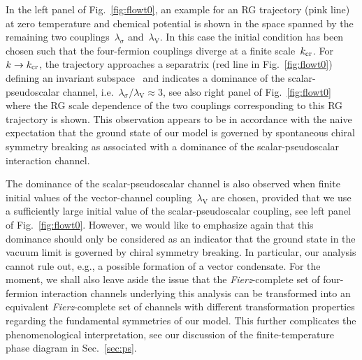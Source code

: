 \documentclass[prd,english,preprintnumbers,amsmath,amssymb,nofootinbib,twocolumn,superscriptaddress]{revtex4-1}
\begin{document}
{In the left panel of Fig.~\ref{fig:flowt0}, an example for an RG trajectory ({pink line}) at zero temperature and chemical potential is shown in the space
spanned by the remaining two couplings~$\lambda_{\sigma}$ and~$\lambda_{\text{V}}$.
In this case the initial condition has been chosen such that the four-fermion couplings diverge at a finite scale~$k_{\rm cr}$. {For~$k\to k_{\rm cr}$, the trajectory 
approaches a separatrix (red line in Fig.~\ref{fig:flowt0}) defining an invariant subspace~\cite{Gehring:2015vja} and indicates a 
dominance of the scalar-pseudoscalar channel, i.e.~$\lambda_\sigma/\lambda_{\text{V}} \approx 3$,
see} also right panel of Fig.~\ref{fig:flowt0} where the RG scale dependence of the two couplings corresponding to this RG trajectory is shown.
This observation appears to be in accordance with the naive expectation that the ground state of our model is governed by spontaneous
chiral symmetry breaking as associated with a dominance of the scalar-pseudoscalar interaction channel. 

The dominance of the scalar-pseudoscalar channel is also observed when finite initial values of
the vector-channel coupling~$\lambda_{\text{V}}$
are chosen, provided that we use a sufficiently large initial value of the scalar-pseudoscalar coupling, see left panel of Fig.~\ref{fig:flowt0}.
However, we would like to emphasize again that this dominance should only be considered as an indicator that the ground state 
in the vacuum limit is governed by chiral symmetry breaking. In particular, our analysis cannot rule out, e.g., 
a possible formation of a vector condensate. For the moment, we shall also leave aside the issue that the {\it Fierz}-complete set of four-fermion interaction channels underlying
this analysis can be transformed into an equivalent {\it Fierz}-complete set of channels with
different transformation properties {regarding the fundamental symmetries} of our model. This further complicates the phenomenological
interpretation, see our discussion of the finite-temperature phase diagram in Sec.~\ref{sec:ps}.

}
\end{document}
